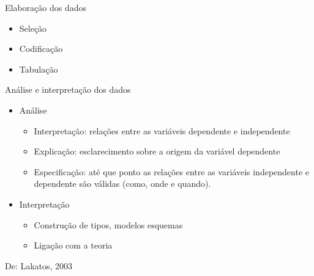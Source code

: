 \documentclass{beamer}
\begin{document}
\begin{frame}{Elaboração dos dados}
  \begin{itemize}
  \item Seleção
  \item Codificação
  \item Tabulação
  \end{itemize}
\end{frame}

\begin{frame}{Análise e interpretação dos dados}
  \begin{itemize}
  \item Análise
    \begin{itemize}
    \item Interpretação: relações entre as variáveis dependente e
      independente
    \item Explicação: esclarecimento sobre a origem da variável
      dependente
    \item Especificação: até que ponto as relações entre as variáveis
      independente e dependente são válidas (como, onde e quando).
    \end{itemize}
  \item Interpretação
    \begin{itemize}
    \item Construção de tipos, modelos esquemas
    \item Ligação com a teoria
    \end{itemize}
  \end{itemize}
  De: Lakatos, 2003
\end{frame}
\end{document}
